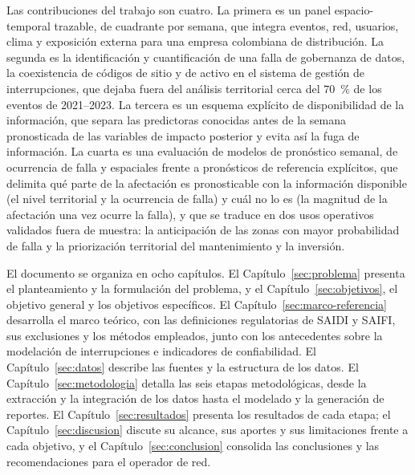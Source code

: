 Las contribuciones del trabajo son cuatro. La primera es un panel espacio-temporal trazable, de cuadrante por semana, que integra eventos, red, usuarios, clima y exposición externa para una empresa colombiana de distribución. La segunda es la identificación y cuantificación de una falla de gobernanza de datos, la coexistencia de códigos de sitio y de activo en el sistema de gestión de interrupciones, que dejaba fuera del análisis territorial cerca del $70$~\% de los eventos de 2021--2023. La tercera es un esquema explícito de disponibilidad de la información, que separa las predictoras conocidas antes de la semana pronosticada de las variables de impacto posterior y evita así la fuga de información. La cuarta es una evaluación de modelos de pronóstico semanal, de ocurrencia de falla y espaciales frente a pronósticos de referencia explícitos, que delimita qué parte de la afectación es pronosticable con la información disponible (el nivel territorial y la ocurrencia de falla) y cuál no lo es (la magnitud de la afectación una vez ocurre la falla), y que se traduce en dos usos operativos validados fuera de muestra: la anticipación de las zonas con mayor probabilidad de falla y la priorización territorial del mantenimiento y la inversión.

El documento se organiza en ocho capítulos. El Capítulo~\ref{sec:problema} presenta el planteamiento y la formulación del problema, y el Capítulo~\ref{sec:objetivos}, el objetivo general y los objetivos específicos. El Capítulo~\ref{sec:marco-referencia} desarrolla el marco teórico, con las definiciones regulatorias de SAIDI y SAIFI, sus exclusiones y los métodos empleados, junto con los antecedentes sobre la modelación de interrupciones e indicadores de confiabilidad. El Capítulo~\ref{sec:datos} describe las fuentes y la estructura de los datos. El Capítulo~\ref{sec:metodologia} detalla las seis etapas metodológicas, desde la extracción y la integración de los datos hasta el modelado y la generación de reportes. El Capítulo~\ref{sec:resultados} presenta los resultados de cada etapa; el Capítulo~\ref{sec:discusion} discute su alcance, sus aportes y sus limitaciones frente a cada objetivo, y el Capítulo~\ref{sec:conclusion} consolida las conclusiones y las recomendaciones para el operador de red.
